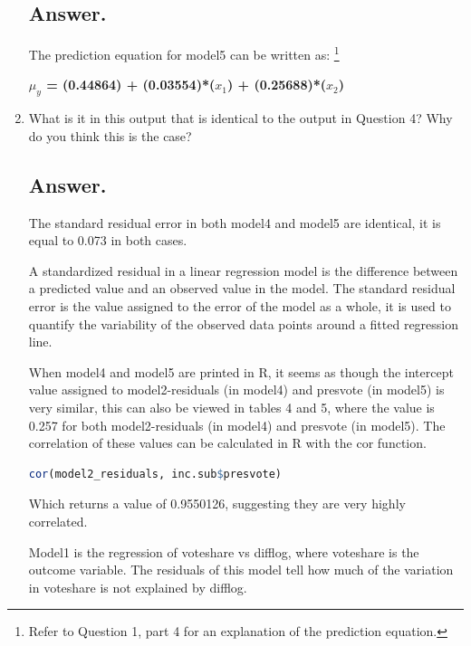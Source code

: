 \documentclass[12pt,letterpaper]{article}
\begin{document}
\begin{enumerate}
		\subsection*{Answer.}
		The prediction equation for model5 can be written as: \footnote{Refer to Question 1, part 4 for an explanation of the prediction equation.}
		
		\vspace{0.1cm}
		
		\textbf{$\mu_y$ = (0.44864) + (0.03554)*($x_1$) + (0.25688)*($x_2$)}
		
		\vspace{2cm}
		
		\item What is it in this output that is identical to the output in Question 4? Why do you think this is the case?
		\subsection*{Answer.}
		The standard residual error in both model4 and model5 are identical, it is equal to 0.073 in both cases.
		
		\vspace{0.1cm}
		
		A standardized residual in a linear regression model is the difference between a predicted value and an observed value in the model. The standard residual error is the value assigned to the error of the model as a whole, it is used to quantify the variability of the observed data points around a fitted regression line.
		
		\vspace{0.1cm}
		
		When model4 and model5 are printed in R, it seems as though the intercept value assigned to model2-residuals (in model4) and presvote (in model5) is very similar, this can also be viewed in tables 4 and 5, where the value is 0.257 for both model2-residuals (in model4) and presvote (in model5). The correlation of these values can be calculated in R with the cor function.
		\begin{lstlisting}[language=R]
			cor(model2_residuals, inc.sub$presvote)
		\end{lstlisting}
		Which returns a value of 0.9550126, suggesting they are very highly correlated.
		
		\vspace{0.1cm}
		
		Model1 is the regression of voteshare vs difflog, where voteshare is the outcome variable. The residuals of this model tell how much of the variation in voteshare is not explained by difflog.
		

\end{enumerate}
\end{document}

